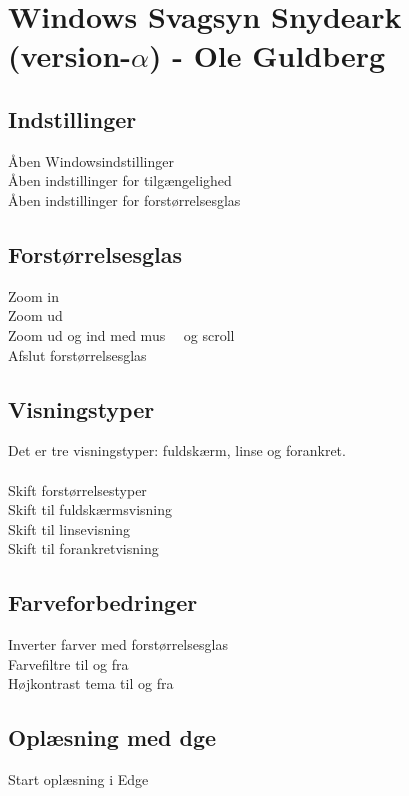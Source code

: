 \documentclass[a4paper, landscape, 11pt]{scrartcl}
\newcommand{\command}[2]{#1~\dotfill{}~#2\\} %
\begin{document}
\section*{Windows Svagsyn Snydeark (version-$\alpha$) - Ole Guldberg}

\hrulefill{}

\begin{multicols}{2}

\subsection*{Indstillinger}
\command{Åben Windowsindstillinger}{}
\command{Åben indstillinger for tilgængelighed}{\keys{\faWindows + u}}
\command{Åben indstillinger for forstørrelsesglas}{\keys{\faWindows + \ctrl + m}}

\subsection*{Forstørrelsesglas}
\command{Zoom in}{\keys{\faWindows + {+}}}
\command{Zoom ud}{\keys{\faWindows + {-}}}
\command{Zoom ud og ind med mus}{\keys{\ctrl + \Alt} og scroll \faArrowsV}
\command{Afslut forstørrelsesglas}{\keys{\faWindows + \esc}}

\subsection*{Visningstyper}
Det er tre visningstyper: fuldskærm, linse og forankret.\\ \\
\command{Skift forstørrelsestyper}{}
\command{Skift til fuldskærmsvisning}{}
\command{Skift til linsevisning}{}
\command{Skift til forankretvisning}{}


\subsection*{Farveforbedringer}
\command{Inverter farver med forstørrelsesglas}{\keys{\ctrl + \Alt + i}}
\command{Farvefiltre til og fra}{}
\command{Højkontrast tema til og fra}{\keys{\shift + \Alt + PrtScn}}

\subsection*{Oplæsning med \faEdge dge}
\command{Start oplæsning i Edge}{}


\end{multicols}
\end{document}
